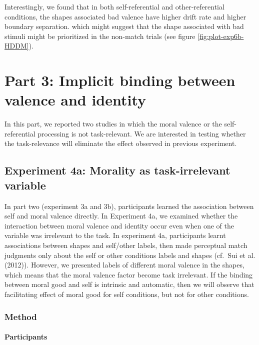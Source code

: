 \documentclass[
  english,
  man]{apa6}
\let\oldparagraph\paragraph
\renewcommand{\paragraph}[1]{\oldparagraph{#1}\mbox{}}
\begin{document}
Interestingly, we found that in both self-referential and other-referential conditions, the shapes associated bad valence have higher drift rate and higher boundary separation. which might suggest that the shape associated with bad stimuli might be prioritized in the non-match trials (see figure \ref{fig:plot-exp6b-HDDM}).

\hypertarget{part-3-implicit-binding-between-valence-and-identity}{%
\section{Part 3: Implicit binding between valence and identity}\label{part-3-implicit-binding-between-valence-and-identity}}

In this part, we reported two studies in which the moral valence or the self-referential processing is not task-relevant. We are interested in testing whether the task-relevance will eliminate the effect observed in previous experiment.

\hypertarget{experiment-4a-morality-as-task-irrelevant-variable}{%
\subsection{Experiment 4a: Morality as task-irrelevant variable}\label{experiment-4a-morality-as-task-irrelevant-variable}}

In part two (experiment 3a and 3b), participants learned the association between self and moral valence directly. In Experiment 4a, we examined whether the interaction between moral valence and identity occur even when one of the variable was irrelevant to the task. In experiment 4a, participants learnt associations between shapes and self/other labels, then made perceptual match judgments only about the self or other conditions labels and shapes (cf.~Sui et al. (2012)). However, we presented labels of different moral valence in the shapes, which means that the moral valence factor become task irrelevant. If the binding between moral good and self is intrinsic and automatic, then we will observe that facilitating effect of moral good for self conditions, but not for other conditions.

\hypertarget{method-6}{%
\subsubsection{Method}\label{method-6}}

\hypertarget{participants-8}{%
\paragraph{Participants}\label{participants-8}}
\end{document}
